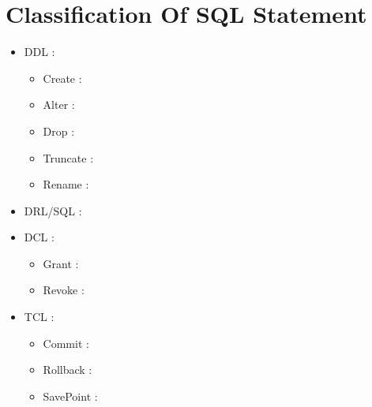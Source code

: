 \section{Classification Of SQL Statement}
\begin{itemize}
    \item DDL :
    \begin{itemize}
        \item Create :
        \item Alter : 
        \item Drop :
        \item Truncate :
        \item Rename : 
    \end{itemize}
    
    \item DRL/SQL :
    \item DCL :
    \begin{itemize}
        \item Grant :
        \item Revoke :
    \end{itemize}

    \item TCL :
    \begin{itemize}
        \item Commit :
        \item Rollback :
        \item SavePoint :
    \end{itemize}
\end{itemize}

